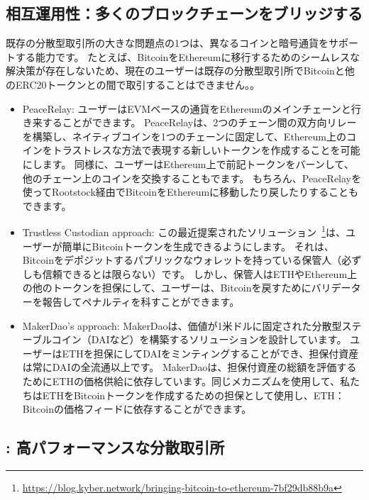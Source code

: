 \subsection{相互運用性：多くのブロックチェーンをブリッジする}

既存の分散型取引所の大きな問題点の1つは、異なるコインと暗号通貨をサポートする能力です。 たとえば、BitcoinをEthereumに移行するためのシームレスな解決策が存在しないため、現在のユーザーは既存の分散型取引所でBitcoinと他のERC20トークンとの間で取引することはできません。。

\begin{itemize}

\item PeaceRelay: ユーザーはEVMベースの通貨をEthereumのメインチェーンと行き来することができます。 PeaceRelayは、2つのチェーン間の双方向リレーを構築し、ネイティブコインを1つのチェーンに固定して、Ethereum上のコインをトラストレスな方法で表現する新しいトークンを作成することを可能にします。 同様に、ユーザーはEthereum上で前記トークンをバーンして、他のチェーン上のコインを交換することもでます。 もちろん、PeaceRelayを使ってRootstock経由でBitcoinをEthereumに移動したり戻したりすることもできます。

\item Trustless Custodian approach: この最近提案されたソリューション~\footnote{\url{https://blog.kyber.network/bringing-bitcoin-to-ethereum-7bf29db88b9a}}は、ユーザーが簡単にBitcoinトークンを生成できるようにします。 それは、Bitcoinをデポジットするパブリックなウォレットを持っている保管人（必ずしも信頼できるとは限らない）です。 しかし、保管人はETHやEthereum上の他のトークンを担保にして、ユーザーは、Bitcoinを戻すためにバリデーターを報告してペナルティを科すことができます。

\item MakerDao’s approach: MakerDaoは、価値が1米ドルに固定された分散型ステーブルコイン（DAIなど）を構築するソリューションを設計しています。 ユーザーはETHを担保にしてDAIをミンティングすることができ、担保付資産は常にDAIの全流通以上です。 MakerDaoは、担保付資産の総額を評価するためにETHの価格供給に依存しています。同じメカニズムを使用して、私たちはETHをBitcoinトークンを作成するための担保として使用し、ETH：Bitcoinの価格フィードに依存することができます。
\end{itemize}

\subsection{\codename: 高パフォーマンスな分散取引所}

